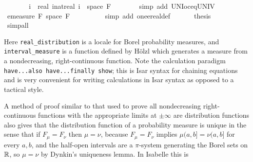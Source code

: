\documentclass{article}
\theoremstyle{definition}
\begin{document}
\begin{isabellebody}
\ \ \ \ \isamarkupfalse%
\ \isamarkupfalse%
\ {\isachardoublequoteopen}{\isacharparenleft}{\isasymUnion}i{\isachardot}\ {\isacharbraceleft}{\isacharminus}\ real\ {\isacharparenleft}i{\isacharcolon}{\isacharcolon}nat{\isacharparenright}{\isacharless}{\isachardot}{\isachardot}real\ i{\isacharbraceright}{\isacharparenright}\ {\isacharequal}\ space\ {\isacharquery}F{\isachardoublequoteclose}\isanewline
\ \ \ \ \ \ \isamarkupfalse%
\ {\isacharparenleft}simp\ add{\isacharcolon}\ UN{\isacharunderscore}Ioc{\isacharunderscore}eq{\isacharunderscore}UNIV{\isacharparenright}\isanewline
\ \ \ \ \isamarkupfalse%
\ \isamarkupfalse%
\ {\isachardoublequoteopen}emeasure\ {\isacharquery}F\ {\isacharparenleft}space\ {\isacharquery}F{\isacharparenright}\ {\isacharequal}\ {}{\isachardoublequoteclose}\isanewline
\ \ \ \ \ \ \isamarkupfalse%
\ {\isacharparenleft}simp\ add{\isacharcolon}\ one{\isacharunderscore}ereal{\isacharunderscore}def{\isacharparenright}\isanewline
\ \ \isamarkupfalse%
\isanewline
\ \ \isamarkupfalse%
\ {\isacharquery}thesis\isanewline
\ \ \ \ \isamarkupfalse%
\ \isamarkupfalse%
\ simp{\isacharunderscore}all\isanewline
{}\isamarkupfalse%
\end{isabellebody}

\medskip

Here \texttt{real\_distribution} is a locale for Borel probability measures, and \texttt{interval\_measure} is a function defined by H\"olzl which generates a measure from a nondecreasing, right-continuous function. Note the calculation paradigm \texttt{have...also have...finally show}; this is Isar syntax for chaining equations and is very convenient for writing calculations in Isar syntax as opposed to a tactical style.

A method of proof similar to that used to prove all nondecreasing right-continuous functions with the appropriate limits at $\pm \infty$ are distribution functions also gives that the distribution function of a probability measure is unique in the sense that if $F_\mu = F_\nu$ then $\mu = \nu$, because $F_\mu = F_\nu$ implies $\mu (a,b] = \nu (a,b]$ for every $a,b$, and the half-open intervals are a $\pi$-system generating the Borel sets on $\mathbb{R}$, so $\mu = \nu$ by Dynkin's uniqueness lemma. In Isabelle this is

\medskip
\end{document}
